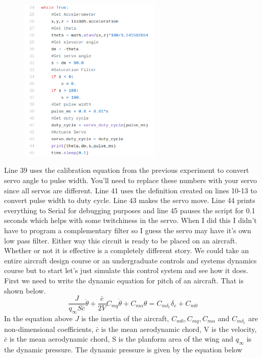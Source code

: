 \begin{figure}[H]
  \begin{center}
    \includegraphics[width=0.6\textwidth]{Figures/feedback2.png}
  \end{center}
\end{figure}
Line 39 uses the calibration equation from the previous experiment to convert servo angle to pulse width. You’ll need to replace these numbers with your servo since all servos are different. Line 41 uses the definition created on lines 10-13 to convert pulse width to duty cycle. Line 43 makes the servo move. Line 44 prints everything to Serial for debugging purposes and line 45 pauses the script for 0.1 seconds which helps with some twitchiness in the servo. When I did this I didn’t have to program a complementary filter so I guess the servo may have it’s own low pass filter. Either way this circuit is ready to be placed on an aircraft. Whether or not it is effective is a completely different story. We could take an entire aircraft design course or an undergraduate controls and systems dynamics course but to start let's just simulate this control system and see how it does. First we need to write the dynamic equation for pitch of an aircraft. That is shown below.
\begin{equation}
\frac{J}{q_{\infty}S\bar{c}}\ddot{\theta} + \frac{\bar{c}}{2V}C_{mq}\dot{\theta} + C_{m\alpha}\theta = C_{m\delta_e}\delta_e + C_{m0}
\end{equation}
In the equation above $J$ is the inertia of the aircraft, $C_{m0},C_{mq},C_{m\alpha}$ and $C_{m\delta_e}$ are non-dimensional coefficients, $\bar{c}$ is the mean aerodynamic chord, V is the velocity, $\bar{c}$ is the mean aerodynamic chord, S is the planform area of the wing and $q_{\infty}$ is the dynamic pressure. The dynamic pressure is given by the equation below
